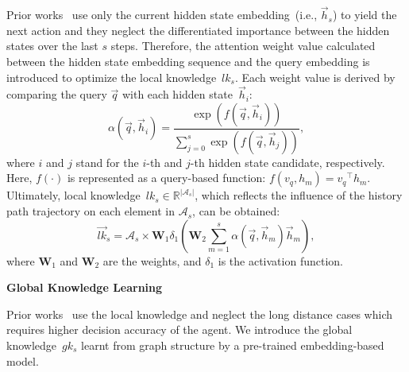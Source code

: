 Prior works~\cite{das2017go,LinEMNLP2018} use only the current hidden state embedding~(i.e., $\vec{h}_{s}$) to yield the next action and they neglect the differentiated importance between the hidden states over the last $s$ steps.
Therefore, the attention weight value calculated between the hidden state embedding sequence and the query embedding is introduced to optimize the local knowledge~$lk_{s}$.
Each weight value is derived by comparing the query ${\vec{q}}$ with each hidden state~$\vec{h}_{i}$: 
\begin{equation}
\alpha({\vec{q}},\vec{h}_{i}) =\frac{\exp (f({\vec{q}},{\vec{h}_{i}}))}{\sum_{j=0}^{s}\exp (f({\vec{q}},{\vec{h}_{j}}))},
\end{equation}
where $i$ and $j$ stand for the $i$-th and $j$-th hidden state candidate, respectively.
Here, $f(\cdot )$ is represented as a query-based function: $f({v_{q}},{h_{m}})={v_{q}}^{\top }{h_{m}}$.
Ultimately, local knowledge~$lk_{s} \in \mathbb{R}^{\left | \mathcal{A}_{s} \right |} $, which reflects the influence of the history path trajectory on each element in $\mathcal{A}_{s}$, can be obtained:
\begin{equation}
\vec{lk}_{s}  ={\mathcal{A}}_{s}\times {\bm{W}}_{1}\delta _{1}({\bm{W}}_{2}\sum_{m=1}^{s}\alpha({\vec{q}},\vec{h}_{m})\vec{h}_{m}),
\label{eq:lpf}
\end{equation}
\noindent where 
${\bm{W}}_{1}$ and ${\bm{W}}_{2}$ are the weights, and $\delta _{1}$ is the activation function.




\noindent
\textbf{Global Knowledge Learning}
\label{sec:GEF}

Prior works~\cite{das2017go,LinEMNLP2018} use the local knowledge and neglect the long distance cases which requires higher decision accuracy of the agent.
We introduce the global knowledge~$gk_{s}$ learnt from graph structure by a pre-trained embedding-based model.

